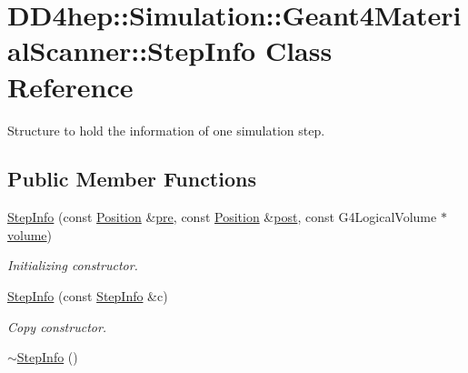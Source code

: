 \hypertarget{class_d_d4hep_1_1_simulation_1_1_geant4_material_scanner_1_1_step_info}{
\section{DD4hep::Simulation::Geant4MaterialScanner::StepInfo Class Reference}
\label{class_d_d4hep_1_1_simulation_1_1_geant4_material_scanner_1_1_step_info}
}


Structure to hold the information of one simulation step.  
\subsection*{Public Member Functions}
\begin{DoxyCompactItemize}
\item 
\hyperlink{class_d_d4hep_1_1_simulation_1_1_geant4_material_scanner_1_1_step_info_a036a76d4b5c8de7d90d610417a7e2fa6}{StepInfo} (const \hyperlink{namespace_d_d4hep_1_1_simulation_ad6fd94b3439e31d1ba4b2e640d578558}{Position} \&\hyperlink{class_d_d4hep_1_1_simulation_1_1_geant4_material_scanner_1_1_step_info_a8a5e62192e0103b052eb2c5885366aec}{pre}, const \hyperlink{namespace_d_d4hep_1_1_simulation_ad6fd94b3439e31d1ba4b2e640d578558}{Position} \&\hyperlink{class_d_d4hep_1_1_simulation_1_1_geant4_material_scanner_1_1_step_info_a0fd16194cb4eeb622e8e1485d3881688}{post}, const G4LogicalVolume $\ast$\hyperlink{class_d_d4hep_1_1_simulation_1_1_geant4_material_scanner_1_1_step_info_ac413cc2216dfa5d0d174c48fd4acbe5b}{volume})
\begin{DoxyCompactList}\small\item\em Initializing constructor. \item\end{DoxyCompactList}\item 
\hyperlink{class_d_d4hep_1_1_simulation_1_1_geant4_material_scanner_1_1_step_info_a378c8dfd8190c95fd6ceefe32cdb127f}{StepInfo} (const \hyperlink{class_d_d4hep_1_1_simulation_1_1_geant4_material_scanner_1_1_step_info}{StepInfo} \&c)
\begin{DoxyCompactList}\small\item\em Copy constructor. \item\end{DoxyCompactList}\item 
\hyperlink{class_d_d4hep_1_1_simulation_1_1_geant4_material_scanner_1_1_step_info_a097ddb25fb641476ab568a192dc44531}{$\sim$StepInfo} ()

\end{DoxyCompactItemize}
